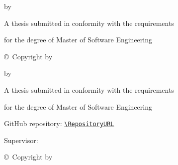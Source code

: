\documentclass[12pt,letterpaper,oneside]{report}
\begin{document}
\begin{titlepage}
\thispagestyle{empty}
\begin{center}
{\bfseries\MakeUppercase{\MinistryName}\par}
{\bfseries\MakeUppercase{\InstitutionName}\par}
\vspace{1.45in}
{\Large\ThesisTitle\par}
\vfill
{\large by\par}
\vspace{0.25in}
{\large\GroupName\par}
\vspace{0.12in}
{\large\AuthorList\par}
\vfill
    {\large A thesis submitted in conformity with the requirements\par}
    {\large for the degree of Master of Software Engineering\par}
\vfill
{\large \copyright\ Copyright by \GroupName\ \ConvocationYear\par}
\end{center}
\end{titlepage}

\begin{titlepage}
\thispagestyle{empty}
\begin{center}
{\bfseries\MakeUppercase{\MinistryName}\par}
{\bfseries\MakeUppercase{\InstitutionName}\par}
\vspace{0.9in}
{\Large\ThesisTitle\par}
\vfill
{\large by\par}
\vspace{0.18in}
{\large\GroupName\par}
\vspace{0.10in}
{\large\AuthorList\par}
\vfill
    {\large A thesis submitted in conformity with the requirements\par}
    {\large for the degree of Master of Software Engineering\par}
\vspace{0.18in}
{\small GitHub repository: \href{\RepositoryURL}{\nolinkurl{\RepositoryURL}}\par}
\vfill
{\large Supervisor:\par}
{\large \SupervisorOne\par}
\vfill
{\large \copyright\ Copyright by \GroupName\ \ConvocationYear\par}
\end{center}
\end{titlepage}
\end{document}

